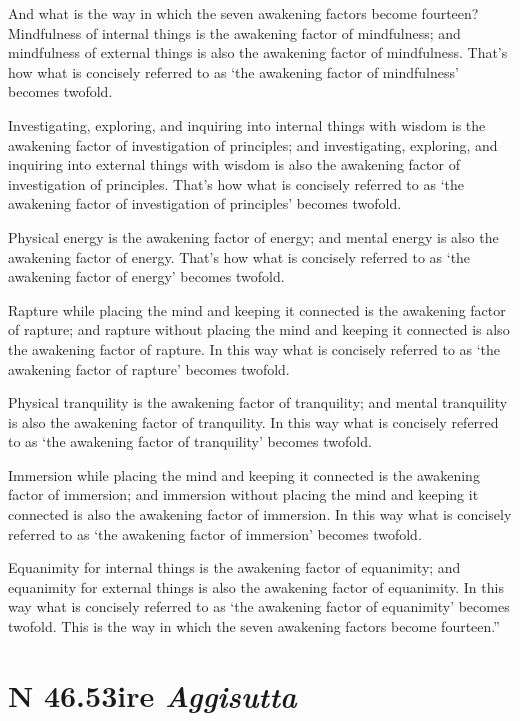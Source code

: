 \documentclass[12pt,openany]{book}%
\newcommand*{\suttatitleacronym}[1]{\smaller[2]{#1}\vspace*{.3em}}
\newcommand*{\suttatitletranslation}[1]{\linebreak{#1}}
\newcommand*{\suttatitleroot}[1]{\linebreak\smaller[2]\itshape{#1}}
\newcommand*{\tocacronym}[1]{\hspace*{-3.3em}{#1}\quad}
\newcommand*{\toctranslation}[1]{#1}
\newcommand*{\tocroot}[1]{(\textit{#1})}
\begin{document}
And what is the way in which the seven awakening factors become fourteen? Mindfulness of internal things is the awakening factor of mindfulness; and mindfulness of external things is also the awakening factor of mindfulness. That’s how what is concisely referred to as ‘the awakening factor of mindfulness’ becomes twofold. 

Investigating, exploring, and inquiring into internal things with wisdom is the awakening factor of investigation of principles; and investigating, exploring, and inquiring into external things with wisdom is also the awakening factor of investigation of principles. That’s how what is concisely referred to as ‘the awakening factor of investigation of principles’ becomes twofold. 

Physical energy is the awakening factor of energy; and mental energy is also the awakening factor of energy. That’s how what is concisely referred to as ‘the awakening factor of energy’ becomes twofold. 

Rapture while placing the mind and keeping it connected is the awakening factor of rapture; and rapture without placing the mind and keeping it connected is also the awakening factor of rapture. In this way what is concisely referred to as ‘the awakening factor of rapture’ becomes twofold. 

Physical tranquility is the awakening factor of tranquility; and mental tranquility is also the awakening factor of tranquility. In this way what is concisely referred to as ‘the awakening factor of tranquility’ becomes twofold. 

Immersion while placing the mind and keeping it connected is the awakening factor of immersion; and immersion without placing the mind and keeping it connected is also the awakening factor of immersion. In this way what is concisely referred to as ‘the awakening factor of immersion’ becomes twofold. 

Equanimity for internal things is the awakening factor of equanimity; and equanimity for external things is also the awakening factor of equanimity. In this way what is concisely referred to as ‘the awakening factor of equanimity’ becomes twofold. This is the way in which the seven awakening factors become fourteen.” 

%
\section*{{\suttatitleacronym SN 46.53}{\suttatitletranslation Fire }{\suttatitleroot Aggisutta}}
\addcontentsline{toc}{section}{\tocacronym{SN 46.53} \toctranslation{Fire } \tocroot{Aggisutta}}
\end{document}
